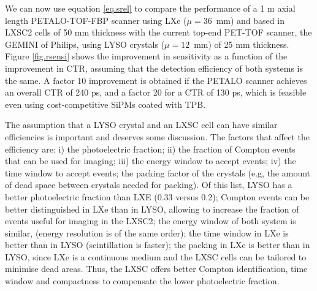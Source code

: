 We can now use equation \ref{eq.srel} to compare the performance of a 1 m axial length PETALO-TOF-FBP scanner using LXe ($\mu = 36$~mm) and based in LXSC2 cells of 50 mm thickness with the current top-end PET-TOF scanner, the GEMINI of Philips, using LYSO crystals ($\mu = 12$~mm) of 25 mm thickness. Figure \ref{fig.rsensi} shows the improvement in sensitivity as a function of the improvement in CTR, assuming that the detection efficiency of both systems is the same. A factor 10 improvement is obtained if the PETALO scanner achieves an overall CTR of 240 ps, and a factor 20 for a CTR of 130 ps, which is feasible even using cost-competitive SiPMs coated with TPB. 

The assumption that a LYSO crystal and an LXSC cell can have similar efficiencies is important and deserves some discussion. The factors that affect the efficiency are: i) the photoelectric fraction; ii) the fraction of Compton events that can be used for imaging; iii) the energy window to accept events; iv) the time window to accept events; the packing factor of the crystals (e.g, the amount of dead space between crystals needed for packing). Of this list, LYSO has a better photoelectric fraction than LXE (0.33 versus 0.2); Compton events can be better distinguished in LXe than in LYSO, allowing to increase the fraction of events useful for imaging in the LXSC2; the energy window of both system is similar, (energy resolution is of the same order); the time window in LXe is better than in LYSO (scintillation is faster); the packing in LXe is better than in LYSO, since LXe is a continuous medium and the LXSC cells can be tailored to minimise dead areas. Thus, the LXSC offers better Compton identification, time window and compactness to compensate the lower photoelectric fraction. 
%

